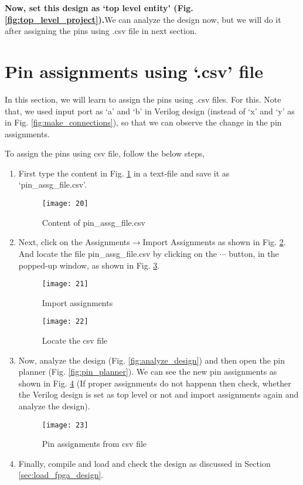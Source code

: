 \textbf{Now, set this design as `top level entity' (Fig. \ref{fig:top_level_project}).}We can analyze the design now, but we will do it after assigning the pins using .csv file in next section.



\section{Pin assignments using `.csv' file}
In this section, we will learn to assign the pins using .csv files. For this. Note that, we used input port as `a' and `b' in Verilog design (instead of `x' and `y' as in Fig. \ref{fig:make_connections}), so that we can observe the change in the pin assignments. 

To assign the pins using csv file, follow the below steps, 

\begin{enumerate}
	\item First type the content in Fig. \ref{fig:pin_ass_csv} in a text-file and save it as `pin\_assg\_file.csv'. 
	
	\begin{figure}[!h]
		\centering
		\texttt{[image: 20]}
		\caption{Content of pin\_assg\_file.csv}
		\label{fig:pin_ass_csv}
	\end{figure}
	
	\item Next, click on the Assignments$\rightarrow$Import Assignments as shown in Fig. \ref{fig:import_assg}. And locate the file pin\_assg\_file.csv by clicking on the $\cdots$ button, in the popped-up window, as shown in Fig. \ref{fig:locate_assg}. 
	
	\begin{figure}
		\centering
		\texttt{[image: 21]}
		\caption{Import assignments}
		\label{fig:import_assg}
	\end{figure}
	
	\begin{figure}[!h]
		\centering
		\texttt{[image: 22]}
		\caption{Locate the csv file}
		\label{fig:locate_assg}
	\end{figure}
	
	\item Now, analyze the design (Fig. \ref{fig:analyze_design}) and then open the pin planner (Fig. \ref{fig:pin_planner}). We can see the new pin assignments as shown in Fig. \ref{fig:pin_assg_from_csv} (If proper assignments do not happenn then check, whether the Verilog design is set as top level or not and import assignments again and analyze the design). 
	
	\begin{figure}
		\centering
		\texttt{[image: 23]}
		\caption{Pin assignments from csv file}
		\label{fig:pin_assg_from_csv}
	\end{figure}
	
	\item Finally, compile and load and check the design as discussed in Section \ref{sec:load_fpga_design}. 
\end{enumerate}


